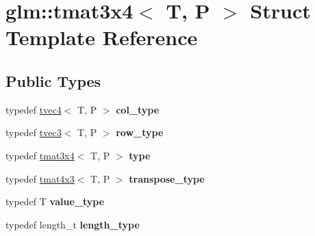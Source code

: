 \hypertarget{structglm_1_1tmat3x4}{\section{glm\-:\-:tmat3x4$<$ T, P $>$ Struct Template Reference}
\label{structglm_1_1tmat3x4}
}
\subsection*{Public Types}
\begin{DoxyCompactItemize}
\item 
\hypertarget{structglm_1_1tmat3x4_aa4c8d5353d59216a2f0566ce462fbc81}{typedef \hyperlink{structglm_1_1tvec4}{tvec4}$<$ T, P $>$ {\bfseries col\-\_\-type}}\label{structglm_1_1tmat3x4_aa4c8d5353d59216a2f0566ce462fbc81}

\item 
\hypertarget{structglm_1_1tmat3x4_a8caa6e2dff35705a17659ac64c6b6782}{typedef \hyperlink{structglm_1_1tvec3}{tvec3}$<$ T, P $>$ {\bfseries row\-\_\-type}}\label{structglm_1_1tmat3x4_a8caa6e2dff35705a17659ac64c6b6782}

\item 
\hypertarget{structglm_1_1tmat3x4_a5af4a499991893e6f02750a29572fd9a}{typedef \hyperlink{structglm_1_1tmat3x4}{tmat3x4}$<$ T, P $>$ {\bfseries type}}\label{structglm_1_1tmat3x4_a5af4a499991893e6f02750a29572fd9a}

\item 
\hypertarget{structglm_1_1tmat3x4_a2ebc6db4342208ffbd1f3c643bcd81e2}{typedef \hyperlink{structglm_1_1tmat4x3}{tmat4x3}$<$ T, P $>$ {\bfseries transpose\-\_\-type}}\label{structglm_1_1tmat3x4_a2ebc6db4342208ffbd1f3c643bcd81e2}

\item 
\hypertarget{structglm_1_1tmat3x4_a027b8d0c3639472d209b40f4cbe2361e}{typedef T {\bfseries value\-\_\-type}}\label{structglm_1_1tmat3x4_a027b8d0c3639472d209b40f4cbe2361e}

\item 
\hypertarget{structglm_1_1tmat3x4_ab857d16b90719de3b23d4fa423d20698}{typedef length\-\_\-t {\bfseries length\-\_\-type}}\label{structglm_1_1tmat3x4_ab857d16b90719de3b23d4fa423d20698}

\end{DoxyCompactItemize}
